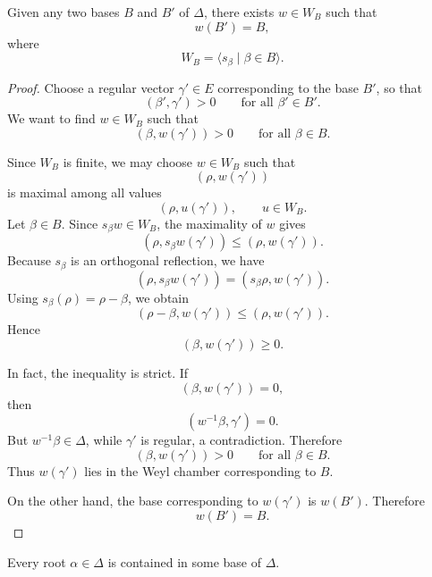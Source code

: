 \begin{lemma}
    Given any two bases \(B\) and \(B'\) of \(\Delta\), there exists
    \(w\in W_B\) such that
    \[
        w(B')=B,
    \]
    where
    \[
        W_B=\langle s_\beta\mid \beta\in B\rangle .
    \]
\end{lemma}

\begin{proof}
    Choose a regular vector \(\gamma'\in E\) corresponding to the base \(B'\),
    so that
    \[
        (\beta',\gamma')>0
        \qquad\text{for all } \beta'\in B'.
    \]
    We want to find \(w\in W_B\) such that
    \[
        (\beta,w(\gamma'))>0
        \qquad\text{for all } \beta\in B.
    \]

    Since \(W_B\) is finite, we may choose \(w\in W_B\) such that
    \[
        (\rho,w(\gamma'))
    \]
    is maximal among all values
    \[
        (\rho,u(\gamma')),
        \qquad u\in W_B.
    \]
    Let \(\beta\in B\). Since \(s_\beta w\in W_B\), the maximality of \(w\)
    gives
    \[
        (\rho,s_\beta w(\gamma'))
        \leq
        (\rho,w(\gamma')).
    \]
    Because \(s_\beta\) is an orthogonal reflection, we have
    \[
        (\rho,s_\beta w(\gamma'))
        =
        (s_\beta\rho,w(\gamma')).
    \]
    Using \(s_\beta(\rho)=\rho-\beta\), we obtain
    \[
        (\rho-\beta,w(\gamma'))
        \leq
        (\rho,w(\gamma')).
    \]
    Hence
    \[
        (\beta,w(\gamma'))\geq 0.
    \]

    In fact, the inequality is strict. If
    \[
        (\beta,w(\gamma'))=0,
    \]
    then
    \[
        (w^{-1}\beta,\gamma')=0.
    \]
    But \(w^{-1}\beta\in\Delta\), while \(\gamma'\) is regular, a contradiction.
    Therefore
    \[
        (\beta,w(\gamma'))>0
        \qquad\text{for all } \beta\in B.
    \]
    Thus \(w(\gamma')\) lies in the Weyl chamber corresponding to \(B\).

    On the other hand, the base corresponding to \(w(\gamma')\) is \(w(B')\).
    Therefore
    \[
        w(B')=B.
    \]
\end{proof}

\begin{lemma}
    Every root \(\alpha\in\Delta\) is contained in some base of \(\Delta\).
\end{lemma}

